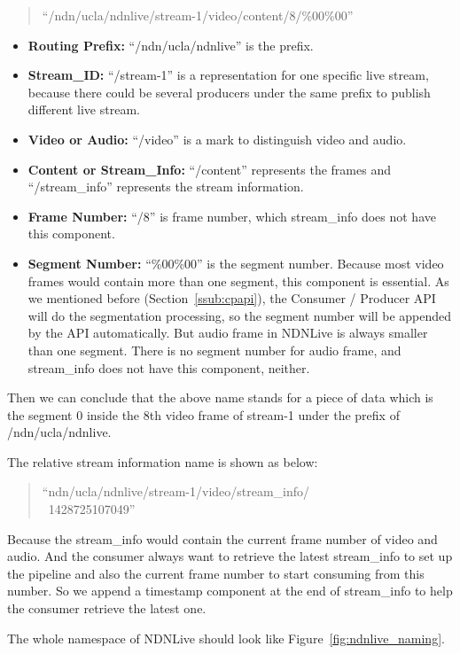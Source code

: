 \begin{quote}
``/ndn/ucla/ndnlive/stream-1/video/content/8/\%00\%00''
\end{quote}
\begin{itemize}
	\item{\textbf{Routing Prefix:}} ``/ndn/ucla/ndnlive'' is the prefix.
	\item{\textbf{Stream\_ID:}} ``/stream-1'' is a representation for one specific live stream, because there could be several producers under the same prefix to publish different live stream.
	\item{\textbf{Video or Audio:}} ``/video'' is a mark to distinguish video and audio.
	\item{\textbf{Content or Stream\_Info:}} ``/content'' represents the frames and ``/stream\_info'' represents the stream information.
	\item{\textbf{Frame Number:}} ``/8'' is frame number, which stream\_info does not have this component.
	\item{\textbf{Segment Number:}} ``\%00\%00'' is the segment number. Because most video frames would contain more than one segment, this component is essential. As we mentioned before (Section~\ref{ssub:cpapi}), the Consumer / Producer API will do the segmentation processing, so the segment number will be appended by the API automatically. But audio frame in NDNLive is always smaller than one segment. There is no segment number for audio frame, and stream\_info does not have this component, neither.
\end{itemize}

Then we can conclude that the above name stands for a piece of data which is the segment 0 inside the 8th video frame of stream-1 under the prefix of /ndn/ucla/ndnlive. 

The relative stream information name is shown as below:
\begin{quote}
``ndn/ucla/ndnlive/stream-1/video/stream\_info/ \\\ 1428725107049''
\end{quote}

Because the stream\_info would contain the current frame number of video and audio. And the consumer always want to retrieve the latest stream\_info to set up the pipeline and also the current frame number to start consuming from this number. So we append a timestamp component at the end of stream\_info to help the consumer retrieve the latest one.

The whole namespace of NDNLive should look like Figure~\ref{fig:ndnlive_naming}.

